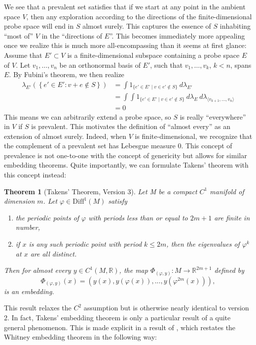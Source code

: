 \documentclass[11pt, a4paper]{memoir}
\theoremstyle{break}
\newtheorem{thm}{Theorem}
\theoremstyle{break}
\theoremstyle{nonumberplain}
\newcommand{\mR}{\mathbb{R}}
\begin{document}
We see that a prevalent set satisfies that if we start at any point in the ambient space $V$, then any exploration according to the directions of the finite-dimensional probe space will end in $S$ almost surely. This captures the essence of $S$ inhabiting \enquote{most of} $V$ in the \enquote{directions of $E$}. This becomes immediately more appealing once we realize this is much more all-encompassing than it seems at first glance: Assume that $E'\subset V$ is a finite-dimensional subspace containing a probe space $E$ of $V$. Let $v_1,\ldots,v_n$ be an orthonormal basis of $E'$, such that $v_1,\ldots,v_k$, $k<n$, spans $E$. By Fubini's theorem, we then realize
\begin{align*}
\lambda_{E'}\left(\left\{e'\in E':v+e\not\in S\right\}\right)&=\int 1_{\{e'\in E'\mid v\in e'\notin S\}}\ d\lambda_{E'}\\
&=\int\int 1_{\{e'\in E'\mid  v\in e'\notin S\}}\ d\lambda_{E}\ d\lambda_{\langle v_{k+1},\ldots, v_n \rangle}\\
&=0
\end{align*}
This means we can arbitrarily extend a probe space, so $S$ is really \enquote{everywhere} in $V$ if $S$ is prevalent. This motivates the definition of \enquote{almost every} as an extension of almost surely. Indeed, when $V$ is finite-dimensional, we recognize that the complement of a prevalent set has Lebesgue measure 0. This concept of prevalence is not one-to-one with the concept of genericity but allows for similar embedding theorems. Quite importantly, we can formulate Takens' theorem with this concept instead:
\begin{thm}[Takens' Theorem, Version 3]
Let M be a compact $C^1$ manifold of dimension $m$. Let $\varphi\in\text{Diff}^1(M)$ satisfy
\begin{enumerate}[label=\arabic*)]
	\item the periodic points of $\varphi$ with periods less than or equal to $2m+1$ are finite in number,
	\item if $x$ is any such periodic point with period $k\leqslant 2m$, then the eigenvalues of $\varphi^k$ at $x$ are all distinct.
\end{enumerate}
 Then for almost every $y\in C^1(M,\mR)$, the map $\Phi_{(\varphi,y)}:M\to \mathbb{R}^{2m+1}$ defined by
$$\Phi_{(\varphi,y)}(x)=(y(x),y(\varphi(x)),...,y(\varphi^{2m}(x))),$$
is an embedding. \cite{Sauer1991}
\end{thm}
This result relaxes the $C^2$ assumption but is otherwise nearly identical to version 2. In fact, Takens' embedding theorem is only a particular result of a quite general phenomenon. This is made explicit in a result of \cite{Sauer1991}, which restates the Whitney embedding theorem in the following way:
\end{document}
